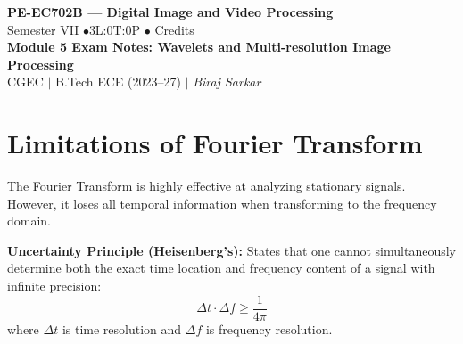 \documentclass[12pt,a4paper]{article}
\begin{document}

\begin{center}
  {\LARGE\bfseries\color{myred} PE-EC702B --- Digital Image and Video Processing}\\[5pt]
  {\normalsize\color{mydark} Semester VII \quad$\bullet$\quad 3L:0T:0P \quad$\bullet$ Credits}\\[3pt]
  {\normalsize\color{myteal}\textbf{Module 5 Exam Notes: Wavelets and Multi-resolution Image Processing}}\\[3pt]
  {\small\color{mydark} CGEC \;$|$\; B.Tech ECE (2023--27) \;$|$\; \textit{Biraj Sarkar}}
\end{center}
\vspace{2pt}
\noindent{\color{myred}\rule{\linewidth}{1.5pt}}
\vspace{2pt}

\hypersetup{linkcolor=mydark}
\tableofcontents
\hypersetup{linkcolor=myteal}
\newpage

\section{Limitations of Fourier Transform}

The Fourier Transform is highly effective at analyzing stationary signals. However, it loses all temporal information when transforming to the frequency domain.

\begin{tcolorbox}[defbox, title={Time-Frequency Limitations}]
\textbf{Uncertainty Principle (Heisenberg's):} States that one cannot simultaneously determine both the exact time location and frequency content of a signal with infinite precision:
\begin{equation}
  \Delta t \cdot \Delta f \ge \frac{1}{4\pi}
\end{equation}
where $\Delta t$ is time resolution and $\Delta f$ is frequency resolution.
\end{tcolorbox}
\end{document}

